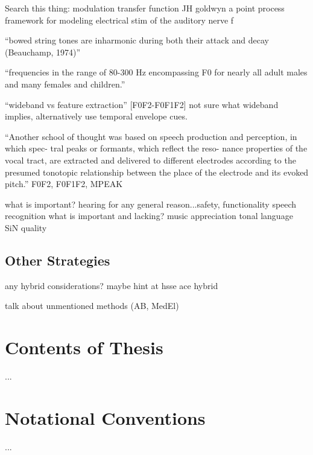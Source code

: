 \documentclass [11pt, proquest,oneside] {uwthesis}[2015/03/03]
\begin{document}
Search this thing:
modulation transfer function
JH goldwyn
a point process framework for modeling electrical stim of the auditory nerve
f

``bowed string tones are inharmonic during both their attack and decay (Beauchamp, 1974)''

``frequencies in the range of 80-300 Hz encompassing F0 for nearly all adult males and many females and children.''


``wideband vs feature extraction'' [F0F2-F0F1F2]
not sure what wideband implies, alternatively use temporal envelope cues.

``Another school of thought was based on speech production and perception, in which spec- tral peaks or formants, which reflect the reso- nance properties of the vocal tract, are extracted and delivered to different electrodes according to the presumed tonotopic relationship between the place of the electrode and its evoked pitch.'' %
F0F2, F0F1F2, MPEAK

    what is important?
        hearing for any general reason...safety, functionality
        speech recognition
    what is important and lacking?
        music appreciation
        tonal language
        SiN
        quality

\subsection{Other Strategies}

any hybrid considerations?  maybe hint at hsse ace hybrid

talk about unmentioned methods (AB, MedEl)


\section{Contents of Thesis}

...

\section{Notational Conventions}

...
\end{document}
